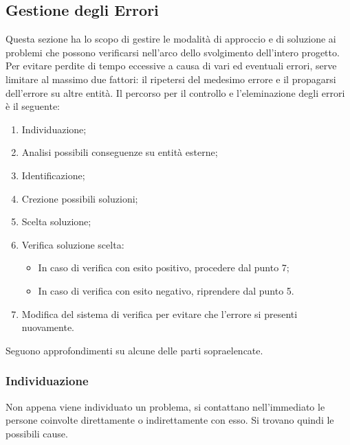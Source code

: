 \subsection{Gestione degli Errori}
Questa sezione ha lo scopo di gestire le modalità di approccio e di soluzione ai problemi 
che possono verificarsi nell'arco dello svolgimento dell'intero progetto.
Per evitare perdite di tempo eccessive a causa di vari ed eventuali errori, serve limitare 
al massimo due fattori: il ripetersi del medesimo errore e il propagarsi dell'errore su altre 
entità. \newline
Il percorso per il controllo e l'eleminazione degli errori è il seguente:
\begin{enumerate}
    \item Individuazione;
    \item Analisi possibili conseguenze su entità esterne;
    \item Identificazione;
    \item Crezione possibili soluzioni;
    \item Scelta soluzione;
    \item Verifica soluzione scelta:
    \begin{itemize}
        \item In caso di verifica con esito positivo, procedere dal punto 7;
        \item In caso di verifica con esito negativo, riprendere dal punto 5.
    \end{itemize}
    \item Modifica del sistema di verifica per evitare che l'errore si presenti nuovamente.
\end{enumerate}
Seguono approfondimenti su alcune delle parti sopraelencate. 
\subsubsection{Individuazione}
Non appena viene individuato un problema, si contattano nell'immediato le persone coinvolte direttamente o 
indirettamente con esso. Si trovano quindi le possibili cause.
